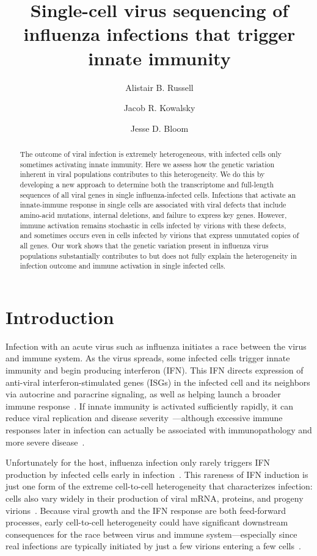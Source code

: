 \documentclass[9pt,lineno]{elife}
\title{Single-cell virus sequencing of influenza infections that trigger innate immunity}
\author[1]{Alistair B. Russell}
\author[1]{Jacob R. Kowalsky}
\author[1,2,3*]{Jesse D. Bloom}
\affil[1]{Basic Sciences Division and Computational Biology Program, Fred Hutchinson Cancer Research Center, Seattle, United States}
\affil[2]{Department of Genome Sciences, University of Washington, Seattle, United States}
\affil[3]{Howard Hughes Medical Institute, Fred Hutchinson Cancer Research Center, Seattle, United States}
\begin{document}
\maketitle

\begin{abstract}
The outcome of viral infection is extremely heterogeneous, with infected cells only sometimes activating innate immunity.  
Here we assess how the genetic variation inherent in viral populations contributes to this heterogeneity.
We do this by developing a new approach to determine both the transcriptome and full-length sequences of all viral genes in single influenza-infected cells.
Infections that activate an innate-immune response in single cells are associated with viral defects that include amino-acid mutations, internal deletions, and failure to express key genes.  
However, immune activation remains stochastic in cells infected by virions with these defects, and sometimes occurs even in cells infected by virions that express unmutated copies of all genes.
Our work shows that the genetic variation present in influenza virus populations substantially contributes to but does not fully explain the heterogeneity in infection outcome and immune activation in single infected cells.
\end{abstract}


\section{Introduction}
Infection with an acute virus such as influenza initiates a race between the virus and immune system.
As the virus spreads, some infected cells trigger innate immunity and begin producing interferon (IFN).
This IFN directs expression of anti-viral interferon-stimulated genes (ISGs) in the infected cell and its neighbors via autocrine and paracrine signaling, as well as helping launch a broader immune response~\citep{stetson2006type,honda2006type}.
If innate immunity is activated sufficiently rapidly, it can reduce viral replication and disease severity~\citep{solov1969results,treanor1987intranasally,beilharz2007protection,kugel2009intranasal,steel2010transmission}---although excessive immune responses later in infection can actually be associated with immunopathology and more severe disease~\citep{la2007question, iwasaki2014innate}.

Unfortunately for the host, influenza infection only rarely triggers IFN production by infected cells early in infection~\citep{kallfass2013visualizing, killip2017single}.
This rareness of IFN induction is just one form of the extreme cell-to-cell heterogeneity that characterizes infection: cells also vary widely in their production of viral mRNA, proteins, and progeny virions~\citep{russell2018extreme,steuerman2018dissection,sjaastad2018distinct,heldt2015single}.
Because viral growth and the IFN response are both feed-forward processes, early cell-to-cell heterogeneity could have significant downstream consequences for the race between virus and immune system---especially since real infections are typically initiated by just a few virions entering a few cells~\citep{mccrone2018stochastic, xue2018reconciling, varble2014influenza}.
\end{document}
